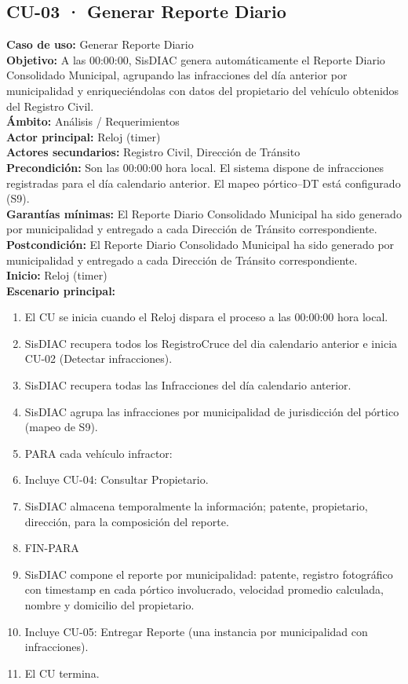 \documentclass[12pt,letterpaper]{article}
\begin{document}
\subsection{CU-03 · Generar Reporte Diario}

\noindent \textbf{Caso de uso:} Generar Reporte Diario \\
\textbf{Objetivo:} A las 00:00:00, SisDIAC genera automáticamente el Reporte Diario Consolidado Municipal, agrupando las infracciones del día anterior por municipalidad y enriqueciéndolas con datos del propietario del vehículo obtenidos del Registro Civil. \\
\textbf{Ámbito:} Análisis / Requerimientos \\
\textbf{Actor principal:} Reloj (timer) \\
\textbf{Actores secundarios:} Registro Civil, Dirección de Tránsito \\
\textbf{Precondición:} Son las 00:00:00 hora local. El sistema dispone de infracciones registradas para el día calendario anterior. El mapeo pórtico--DT está configurado (S9). \\
\textbf{Garantías mínimas:} El Reporte Diario Consolidado Municipal ha sido generado por municipalidad y entregado a cada Dirección de Tránsito correspondiente. \\
\textbf{Postcondición:} El Reporte Diario Consolidado Municipal ha sido generado por municipalidad y entregado a cada Dirección de Tránsito correspondiente. \\
\textbf{Inicio:} Reloj (timer) \\

\noindent \textbf{Escenario principal:}
\begin{enumerate}[nosep, leftmargin=*]
	\item El CU se inicia cuando el Reloj dispara el proceso a las 00:00:00 hora local.
	\item SisDIAC recupera todos los RegistroCruce del dia calendario anterior e inicia CU-02 (Detectar infracciones).
	\item SisDIAC recupera todas las Infracciones del día calendario anterior.
	\item SisDIAC agrupa las infracciones por municipalidad de jurisdicción del pórtico (mapeo de S9).
	\item[] PARA cada vehículo infractor:
	\item Incluye CU-04: Consultar Propietario.
	\item SisDIAC almacena temporalmente la información; patente, propietario, dirección, para la composición del reporte.
	\item[] FIN-PARA
	\item SisDIAC compone el reporte por municipalidad: patente, registro fotográfico con timestamp en cada pórtico involucrado, velocidad promedio calculada, nombre y domicilio del propietario.
	\item Incluye CU-05: Entregar Reporte (una instancia por municipalidad con infracciones).
	\item El CU termina.
\end{enumerate}
\end{document}
